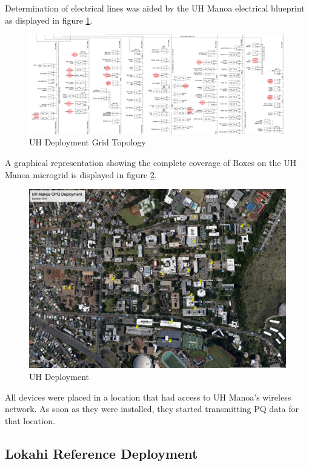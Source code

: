 Determination of electrical lines was aided by the UH Manoa electrical blueprint as displayed in figure \ref{fig:UhGridTopo}.

\begin{figure}
	\centering
	\includegraphics[width=\linewidth]{figures/uh_thesis_depoyment_v1.png}
	\caption{UH Deployment Grid Topology}
	\label{fig:UhGridTopo}
\end{figure}

A graphical representation showing the complete coverage of Boxes on the UH Manoa microgrid is displayed in figure \ref{fig:UhDeploy}.

\begin{figure}
	\centering
	\includegraphics[width=\linewidth]{figures/deploy.jpg}
	\caption{UH Deployment}
	\label{fig:UhDeploy}
\end{figure}

All devices were placed in a location that had access to UH Manoa's wireless network. As soon as they were installed, they started transmitting PQ data for that location.

\subsection{Lokahi Reference Deployment}

